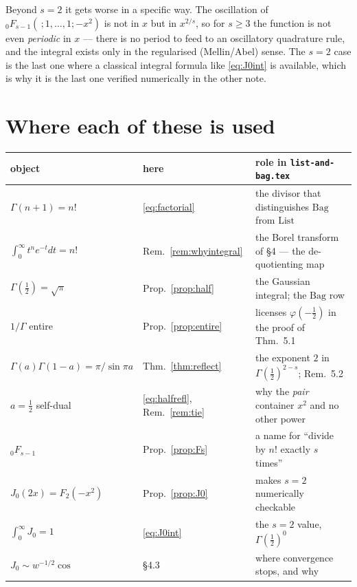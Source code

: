 \documentclass[11pt,a4paper]{article}
\theoremstyle{definition}
\theoremstyle{remark}
\begin{document}
Beyond $s = 2$ it gets worse in a specific way. The oscillation of
${}_0F_{s-1}(\,;1,\dots,1;-x^2)$ is not in $x$ but in $x^{2/s}$, so for $s \ge 3$ the
function is not even \emph{periodic} in $x$ --- there is no period to feed to an
oscillatory quadrature rule, and the integral exists only in the regularised
(Mellin/Abel) sense. The $s = 2$ case is the last one where a classical integral
formula like \eqref{eq:J0int} is available, which is why it is the last one verified
numerically in the other note.

\section{Where each of these is used}

\begin{center}
\small
\renewcommand{\arraystretch}{1.25}
\begin{tabular}{@{}llp{}@{}}
\toprule
object & here & role in \texttt{list-and-bag.tex} \\
\midrule
$\Gamma(n+1) = n!$ & \eqref{eq:factorial} & the divisor that distinguishes
$\mathrm{Bag}$ from $\mathrm{List}$ \\
$\int_0^\infty t^n e^{-t}dt = n!$ & Rem.~\ref{rem:whyintegral} & the Borel transform
of \S4 --- the de-quotienting map \\
$\Gamma(\tfrac12) = \sqrt{\pi}$ & Prop.~\ref{prop:half} & the Gaussian integral; the
$\mathrm{Bag}$ row \\
$1/\Gamma$ entire & Prop.~\ref{prop:entire} & licenses $\varphi(-\tfrac12)$ in the
proof of Thm.~5.1 \\
$\Gamma(a)\Gamma(1-a) = \pi/\sin\pi a$ & Thm.~\ref{thm:reflect} & the exponent $2$ in
$\Gamma(\tfrac12)^{2-s}$; Rem.~5.2 \\
$a = \tfrac12$ self-dual & \eqref{eq:halfrefl}, Rem.~\ref{rem:tie} & why the
\emph{pair} container $x^2$ and no other power \\
${}_0F_{s-1}$ & Prop.~\ref{prop:Fs} & a name for ``divide by $n!$ exactly $s$ times'' \\
$J_0(2x) = F_2(-x^2)$ & Prop.~\ref{prop:J0} & makes $s=2$ numerically checkable \\
$\int_0^\infty J_0 = 1$ & \eqref{eq:J0int} & the $s=2$ value, $\Gamma(\tfrac12)^0$ \\
$J_0 \sim w^{-1/2}\cos$ & \S4.3 & where convergence stops, and why \\
\bottomrule
\end{tabular}
\end{center}
\end{document}
